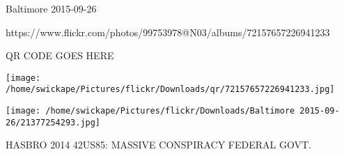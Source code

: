 \documentclass[10pt,letterpaper]{article}
\begin{document}
Baltimore 2015-09-26

https://www.flickr.com/photos/99753978@N03/albums/72157657226941233

QR CODE GOES HERE

\texttt{[image: /home/swickape/Pictures/flickr/Downloads/qr/72157657226941233.jpg]}
\pagebreak

\texttt{[image: /home/swickape/Pictures/flickr/Downloads/Baltimore 2015-09-26/21377254293.jpg]}

HASBRO 2014 42US85: MASSIVE CONSPIRACY FEDERAL GOVT.\\
\pagebreak
\end{document}

